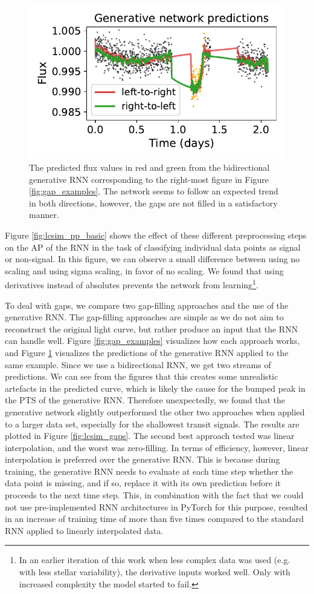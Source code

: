 \begin{figure}
    \centering
    \includegraphics[width=0.35\linewidth]{Experiments/Figures/Preprocessing/generative-rnn_predictions.pdf}
    \caption{The predicted flux values in red and green from the bidirectional generative RNN corresponding to the right-most figure in Figure \ref{fig:gap_examples}. The network seems to follow an expected trend in both directions, however, the gaps are not filled in a satisfactory manner.}
    \label{fig:generative_preds}
\end{figure}

Figure \ref{fig:lcsim_pp_basic} shows the effect of these different preprocessing steps on the AP of the RNN in the task of classifying individual data points as signal or non-signal. In this figure, we can observe a small difference between using no scaling and using sigma scaling, in favor of no scaling. We found that using derivatives instead of absolutes prevents the network from learning\footnote{In an earlier iteration of this work when less complex data was used (e.g. with less stellar variability), the derivative inputs worked well. Only with increased complexity the model started to fail.}.

To deal with gaps, we compare two gap-filling approaches and the use of the generative RNN. The gap-filling approaches are simple as we do not aim to reconstruct the original light curve, but rather produce an input that the RNN can handle well. Figure \ref{fig:gap_examples} visualizes how each approach works, and Figure \ref{fig:generative_preds} visualizes the predictions of the generative RNN applied to the same example. Since we use a bidirectional RNN, we get two streams of predictions. We can see from the figures that this creates some unrealistic artefacts in the predicted curve, which is likely the cause for the bumped peak in the PTS of the generative RNN. Therefore unexpectedly, we found that the generative network slightly outperformed the other two approaches when applied to a larger data set, especially for the shallowest transit signals. The results are plotted in Figure \ref{fig:lcsim_gaps}. The second best approach tested was linear interpolation, and the worst was zero-filling. In terms of efficiency, however, linear interpolation is preferred over the generative RNN. This is because during training, the generative RNN needs to evaluate at each time step whether the data point is missing, and if so, replace it with its own prediction before it proceeds to the next time step. This, in combination with the fact that we could not use pre-implemented RNN architectures in PyTorch for this purpose, resulted in an increase of training time of more than five times compared to the standard RNN applied to linearly interpolated data.

